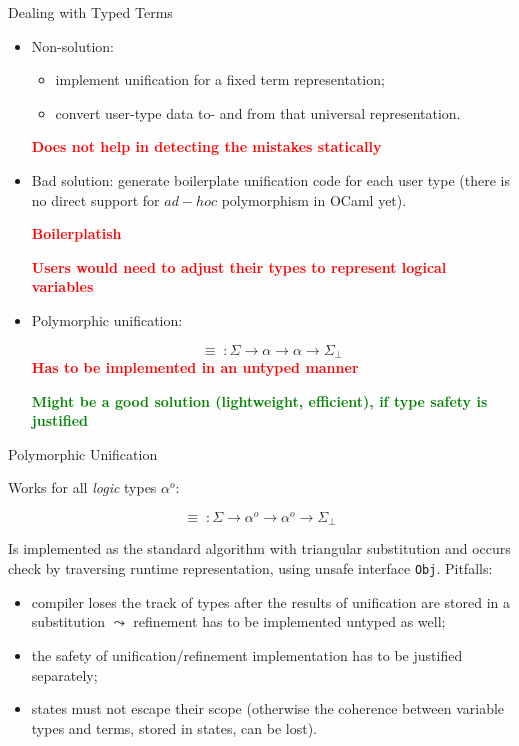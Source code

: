 \documentclass[10pt, mathserif]{beamer}
\newcommand{\oo}[1]{{#1}^o}
\theoremstyle{definition}
\begin{document}
\begin{frame}[fragile]{Dealing with Typed Terms}
\pause
\begin{itemize}
  \item Non-solution: 
     \begin{itemize}
        \item implement unification for a fixed term representation;
        \item convert user-type data to- and from that universal representation.
      \end{itemize}\pause
      {\small\bf\textcolor{red}{Does not help in detecting the mistakes statically}}\pause 
  \item Bad solution: generate boilerplate unification code for each user type 
      (there is no direct support for $ad-hoc$ polymorphism in OCaml yet).\pause
      
      {\small\textcolor{red}{\bf Boilerplatish}}\pause

      {\small\textcolor{red}{\bf Users would need to adjust their types to represent logical variables}}\pause
  \item Polymorphic unification:

    $$
     \equiv\;\colon \Sigma\to\alpha\to\alpha\to\Sigma_{\perp}
    $$\pause
    \small
    {\bf\textcolor{red}{Has to be implemented in an untyped manner}}
    \pause

    {\bf\textcolor{green}{Might be a good solution (lightweight, efficient), if  
    type safety is justified}}
\end{itemize}

\end{frame}

\begin{frame}[fragile]{Polymorphic Unification}

Works for all \emph{logic} types $\oo{\alpha}$:

$$
\equiv\;\colon \Sigma\to\oo{\alpha}\to\oo{\alpha}\to\Sigma_{\perp}
$$
\pause

Is implemented as the standard algorithm with triangular substitution
and occurs check by traversing runtime representation, using
unsafe interface \lstinline{Obj}.
\pause
\vskip3mm
Pitfalls:

\begin{itemize}
\item compiler loses the track of types after the results of unification
are stored in a substitution $\leadsto$ refinement has to be implemented untyped as well;\pause
\item the safety of unification/refinement implementation has to be justified separately;\pause
\item states must not escape their scope (otherwise the coherence between variable
types and terms, stored in states, can be lost).
\end{itemize}
\end{frame}
\end{document}
